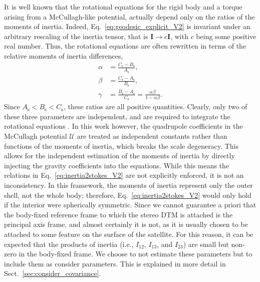\documentclass[lineno, pdflatex,sn-mathphys-ay]{sn-jnl}
\theoremstyle{thmstyleone}%
\theoremstyle{thmstyletwo}%
\theoremstyle{thmstylethree}%
\renewcommand{\vec}[1]{\boldsymbol{#1}}
\begin{document}
It is well known that the rotational equations for the rigid body and a torque arising from a McCullagh-like potential, actually depend only on the ratios of the moments of inertia.
Indeed, Eq.~\eqref{eq:geodesic_explicit_V2} is invariant under an arbitrary rescaling of the inertia tensor, that is ${\vec{I} \rightarrow c \vec{I}}$, with $c$ being some positive real number. 
Thus, the rotational equations are often rewritten in terms of the relative moments of inertia differences,
%
\begin{subequations}
\begin{align}
\alpha &= \frac{C_\mathrm{s} - B_\mathrm{s}}{A_\mathrm{s}}, \\%
\beta &= \frac{C_\mathrm{s} - A_\mathrm{s}}{B_\mathrm{s}}, \\ %
\gamma &= \frac{B_\mathrm{s} - A_\mathrm{s}}{C_\mathrm{s}} 
= \frac{\alpha\beta}{1-\alpha\beta}.
\end{align}
\end{subequations}
%
Since ${A_\mathrm{s}<B_\mathrm{s}<C_\mathrm{s}}$, these ratios are all positive quantities.
Clearly, only two of these three parameters are independent, and are required to integrate the rotational equations \citep{1965AJ.....70..466E}.
%
In this work however, the quadrupole coefficients in the McCullagh potential $\mathcal{U}$ are treated as independent constants rather than functions of the moments of inertia, which breaks the scale degeneracy. This allows for the independent estimation of the moments of inertia by directly injecting the gravity coefficients into the equations. While this means the relations in Eq.~\ref{eq:inertia2stokes_V2} are not explicitly enforced, it is not an inconsistency. In this framework, the moments of inertia represent only the outer shell, not the whole body; therefore, Eq.~\ref{eq:inertia2stokes_V2} would only hold if the interior were spherically symmetric.
%
Since we cannot guarantee a priori that the body-fixed reference frame to which the stereo DTM is attached is the principal axis frame, and almost certainly it is not, as it is usually chosen to be attached to some feature on the surface of the satellite. 
For this reason, it can be expected that the products of inertia (i.e., $I_{12}$,  $I_{13}$, and  $I_{23}$) are small but non-zero in the body-fixed frame. We choose to not estimate these parameters but to include them as consider parameters. This is explained in more detail in Sect.~\ref{sec:consider_covariance}.
\end{document}
